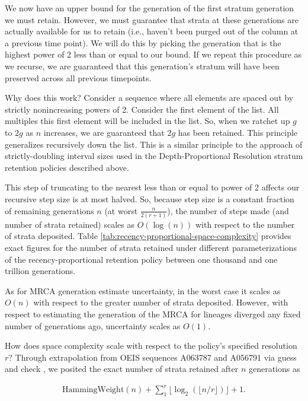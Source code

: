 We now have an upper bound for the generation of the first stratum generation we must retain.
However, we must guarantee that strata at these generations are actually available for us to retain (i.e., haven't been purged out of the column at a previous time point).
We will do this by picking the generation that is the highest power of 2 less than or equal to our bound.
If we repeat this procedure as we recurse, we are guaranteed that this generation's stratum will have been preserved across all previous timepoints.

Why does this work?
Consider a sequence where all elements are spaced out by strictly nonincreasing powers of 2.
Consider the first element of the list.
All multiples this first element will be included in the list.
So, when we ratchet up $g$ to $2g$ as $n$ increases, we are guaranteed that $2g$ has been retained.
This principle generalizes recursively down the list.
This is a similar principle to the approach of strictly-doubling interval sizes used in the Depth-Proportional Resolution stratum retention policies described above.

This step of truncating to the nearest less than or equal to power of 2 affects our recursive step size is at most halved.
So, because step size is a constant fraction of remaining generations $n$ (at worst $\frac{n}{2(r+1)}$), the number of steps made (and number of strata retained) scales as $O(\log(n))$ with respect to the number of strata deposited.
Table \ref{tab:recency-proportional-space-complexity} provides exact figures for the number of strata retained under different parameterizations of the recency-proportional retention policy between one thousand and one trillion generations.

As for MRCA generation estimate uncertainty, in the worst case it scales as $O(n)$ with respect to the greater number of strata deposited.
However, with respect to estimating the generation of the MRCA for lineages diverged any fixed number of generations ago, uncertainty scales as $O(1)$.

How does space complexity scale with respect to the policy's specified resolution $r$?
Through extrapolation from OEIS sequences A063787 and A056791 via guess and check \citep{sloane2021a063787,sloane2021a056791}, we posited the exact number of strata retained after $n$ generations as

\begin{align*}
  \mathrm{HammingWeight}(n)
  + \sum_1^r \lfloor \log_2( \lfloor n / r \rfloor ) \rfloor
  + 1.
\end{align*}

